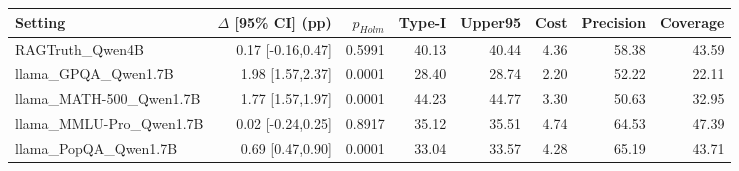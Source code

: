 \begin{tabular}{lrrrrrrr}
\toprule
Setting & $\Delta$ [95\% CI] (pp) & $p_{Holm}$ & Type-I & Upper95 & Cost & Precision & Coverage \\
\midrule
RAGTruth\_Qwen4B & 0.17 [-0.16,0.47] & 0.5991 & 40.13 & 40.44 & 4.36 & 58.38 & 43.59 \\
llama\_GPQA\_Qwen1.7B & 1.98 [1.57,2.37] & 0.0001 & 28.40 & 28.74 & 2.20 & 52.22 & 22.11 \\
llama\_MATH-500\_Qwen1.7B & 1.77 [1.57,1.97] & 0.0001 & 44.23 & 44.77 & 3.30 & 50.63 & 32.95 \\
llama\_MMLU-Pro\_Qwen1.7B & 0.02 [-0.24,0.25] & 0.8917 & 35.12 & 35.51 & 4.74 & 64.53 & 47.39 \\
llama\_PopQA\_Qwen1.7B & 0.69 [0.47,0.90] & 0.0001 & 33.04 & 33.57 & 4.28 & 65.19 & 43.71 \\
\bottomrule
\end{tabular}